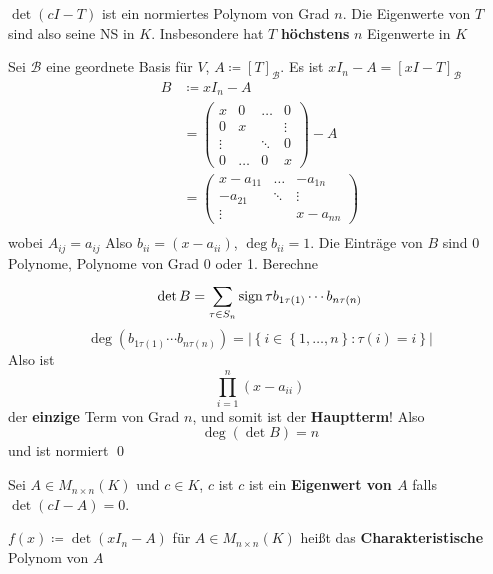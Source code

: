 \begin{subtheorem}
	$ \det\left( cI - T \right)  $ ist ein normiertes Polynom von Grad $ n $.
	Die Eigenwerte von $ T $ sind also seine NS in $ K $.
	Insbesondere hat $ T $ \textbf{höchstens} $ n $ Eigenwerte in $ K $
\end{subtheorem}
\begin{subproof*}
	Sei $ \mathcal{B}  $ eine geordnete Basis für $ V $, $ A \coloneqq [T]_{\mathcal{B} }  $.
	Es ist $ xI_n - A = \left[ xI - T \right]_{\mathcal{B} }  $ 
	\begin{align*}
		B &\coloneqq xI_n - A \\
		~ &= \begin{pmatrix} x & 0 & \hdots & 0 \\ 0 & x & & \vdots \\ \vdots & & \ddots & 0 \\ 0 & \hdots & 0 & x \end{pmatrix} - A \\
		~ &= \begin{pmatrix} x -a_{11} & \hdots & -a_{1n} \\ -a_{21} & \ddots & \vdots \\ \vdots & & x - a_{nn}  \end{pmatrix}  \\
	\end{align*}
	wobei $ A_{ij} = a_{ij}  $ 
	Also $ b_{ii} = (x - a_{i i}) $, $ \deg b_{i i} = 1 $.
	Die Einträge von $ B $ sind 0 Polynome, Polynome von Grad 0 oder 1.
	Berechne
	\[
		\det B = \sum_{\tau \in S_n}^{} \operatorname{sign} \tau b_{1 \tau(1)}  \dotsb b_{n \tau(n)} 
	\]
	\[
		\deg\left( b_{1\tau(1)} \dotsb b_{n\tau(n)}  \right) = \left| \left\{ i \in \left\{ 1, \dotsc, n \right\} : \tau(i) = i \right\}  \right| 
	\]
	Also ist
	\[
		\prod_{i = 1}^{n} \left( x - a_{i i}  \right) 
	\]
	der \textbf{einzige} Term von Grad $ n $, und somit ist der \textbf{Hauptterm}!
	Also
	\[
		\deg\left( \det B \right) = n
	\]
	und ist normiert \qed
\end{subproof*}

\begin{subdefinition}
	Sei $ A \in M_{n \times n} (K) $ und $ c \in K $, $ c $ ist $ c $ ist ein \textbf{Eigenwert von $ A $} falls $ \det\left( cI - A \right) = 0 $.
\end{subdefinition}

\begin{subdefinition}
	$ f(x) \coloneqq \det(xI_n - A) $ für $ A \in M_{n \times n} (K) $
	heißt das \textbf{Charakteristische} Polynom von $ A $
\end{subdefinition}

